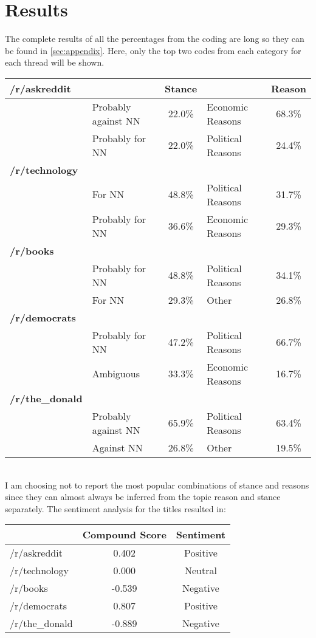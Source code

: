 \documentclass[11pt]{article}
\begin{document}
	\section{Results}\label{sec:results}
	The complete results of all the percentages from the coding are long so they can be found in \cref{sec:appendix}. Here, only the top two codes from each category for each thread will be shown. 
	\\[2\baselineskip]
	\begin{tabular}{l|lc|lc}
		\multicolumn{1}{l}{\textbf{/r/askreddit}} & & \multicolumn{1}{c}{Stance} & & \multicolumn{1}{c}{Reason}\\\hline
		& Probably against NN & 22.0\% & Economic Reasons & 68.3\% \\
		& Probably for NN & 22.0\% & Political Reasons & 24.4\% \\
		\textbf{/r/technology}&&&&\\\hline
		& For NN & 48.8\% & Political Reasons & 31.7\% \\
		& Probably for NN & 36.6\% & Economic Reasons & 29.3\% \\
		\textbf{/r/books}&&&&\\\hline
		& Probably for NN & 48.8\% & Political Reasons & 34.1\% \\
		& For NN & 29.3\% & Other & 26.8\% \\
		\textbf{/r/democrats} &&&&\\\hline
		& Probably for NN & 47.2\% & Political Reasons & 66.7\% \\
		& Ambiguous & 33.3\% & Economic Reasons & 16.7\% \\
		\textbf{/r/the\_donald}&&&&\\\hline
		& Probably against NN & 65.9\% & Political Reasons & 63.4\% \\
		& Against NN & 26.8\% & Other & 19.5\% \\
	\end{tabular}
	\\[2\baselineskip]
	I am choosing not to report the most popular combinations of stance and reasons since they can almost always be inferred from the topic reason and stance separately. The sentiment analysis for the titles resulted in:
	\\[2\baselineskip]
	\begin{tabular}{l|cc}
		& Compound Score & Sentiment \\\hline
		/r/askreddit & 0.402 & Positive \\
		/r/technology & 0.000 & Neutral \\
		/r/books & -0.539 & Negative \\
		/r/democrats & 0.807 & Positive \\
		/r/the\_donald & -0.889 & Negative
	\end{tabular}
\end{document}
